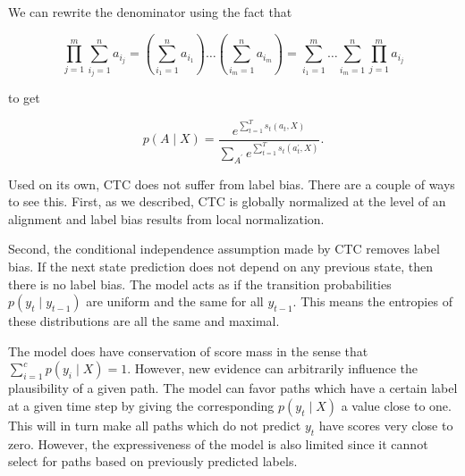 \documentclass[11pt, letterpaper]{article}
\begin{document}
We can rewrite the denominator using the fact that

\begin{equation}
\prod_{j=1}^m \sum_{i_j=1}^n a_{i_j} =
    \left(\sum_{i_1=1}^n a_{i_1}\right) \ldots \left(\sum_{i_m=1}^n a_{i_m}\right)
    = \sum_{i_1=1}^m \ldots \sum_{i_m=1}^n \prod_{j=1}^m a_{i_j}
\end{equation}

to get

\begin{equation}
p(A \mid X) = \frac{e^{\sum_{t=1}^T s_t(a_t, X)}}{\sum_{A^\prime} e^{\sum_{t=1}^T s_t(a^\prime_t, X)}}.
\end{equation}

Used on its own, CTC does not suffer from label bias. There are a couple of
ways to see this. First, as we described, CTC is globally normalized at the
level of an alignment and label bias results from local normalization.

Second, the conditional independence assumption made by CTC removes label bias.
If the next state prediction does not depend on any previous state, then there
is no label bias. The model acts as if the transition probabilities $p(y_t \mid
y_{t-1})$ are uniform and the same for all $y_{t-1}$. This means the entropies
of these distributions are all the same and maximal.

The model does have conservation of score mass in the sense that $\sum_{i=1}^c
p(y_i \mid X) = 1$. However, new evidence can arbitrarily influence the
plausibility of a given path. The model can favor paths which have a certain
label at a given time step by giving the corresponding $p(y_t \mid X)$ a value
close to one. This will in turn make all paths which do not predict $y_t$ have
scores very close to zero. However, the expressiveness of the model is also limited
since it cannot select for paths based on previously predicted labels.



\end{document}
